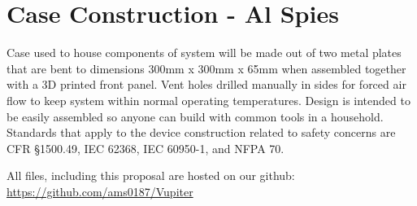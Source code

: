 \documentclass[12pt]{article}
\begin{document}
\section{Case Construction - Al Spies}
	Case used to house components of system will be made out of two metal plates that are bent to dimensions 300mm x 300mm x 65mm when assembled together with a 3D printed front panel. Vent holes drilled manually in sides for forced air flow to keep system within normal operating temperatures. Design is intended to be easily assembled so anyone can build with common tools in a household. Standards that apply to the device construction related to safety concerns are CFR §1500.49\cite{11}, IEC 62368\cite{5}, IEC 60950-1\cite{13}, and NFPA 70\cite{12}.

\noindent


All files, including this proposal are hosted on our github:\\
\url{https://github.com/ams0187/Vupiter}
\pagebreak
\raggedright
\end{document}
